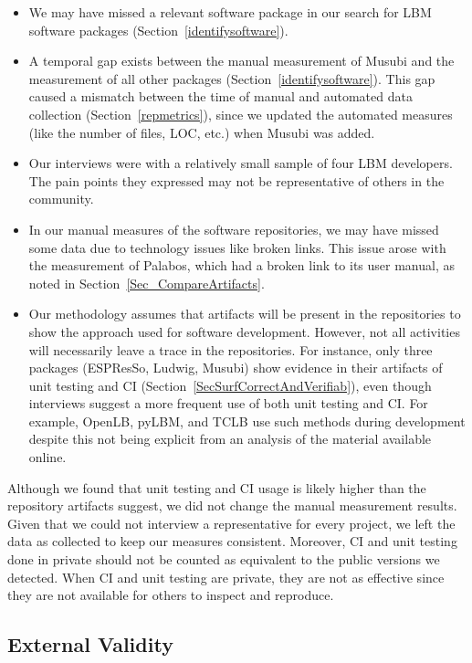 \documentclass[final, 3p, times, authoryear]{elsarticle}
\begin{document}
\begin{itemize}
\item We may have missed a relevant software package in our search for LBM
software packages (Section~\ref{identifysoftware}).
\item A temporal gap exists between the manual measurement of Musubi and the
measurement of all other packages (Section~\ref{identifysoftware}). This gap
caused a mismatch between the time of manual and automated data collection
(Section~\ref{repmetrics}), since we updated the automated measures (like the
number of files, LOC, etc.) when Musubi was added.
\item Our interviews were with a relatively small sample of four LBM developers.
The pain points they expressed may not be representative of others in the
community.
\item In our manual measures of the software repositories, we may have missed
some data due to technology issues like broken links. This issue arose with the
measurement of Palabos, which had a broken link to its user manual, as noted in
Section~\ref{Sec_CompareArtifacts}. 
\item Our methodology assumes that artifacts will be present in the repositories
to show the approach used for software development.  However, not all activities
will necessarily leave a trace in the repositories. For instance, only three
packages (ESPResSo, Ludwig, Musubi) show evidence in their artifacts of unit
testing and CI (Section~\ref{SecSurfCorrectAndVerifiab}), even though interviews
suggest a more frequent use of both unit testing and CI. For example, OpenLB,
pyLBM, and TCLB use such methods during development despite this not being
explicit from an analysis of the material available online.
\end{itemize}

Although we found that unit testing and CI usage is likely higher than the
repository artifacts suggest, we did not change the manual measurement results.
Given that we could not interview a representative for every project, we left
the data as collected to keep our measures consistent.  Moreover, CI and unit
testing done in private should not be counted as equivalent to the public
versions we detected.  When CI and unit testing are private, they are not as
effective since they are not available for others to inspect and reproduce.

\subsection{External Validity}
\end{document}
